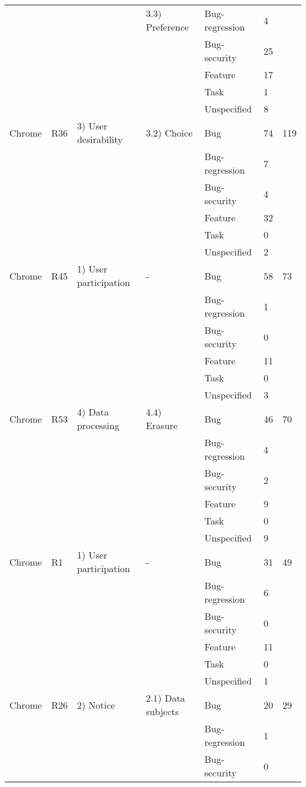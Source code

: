 \documentclass{article}
\begin{document}
\begin{table}[ht]
{\begin{tabular}{|l|l|l|l|l|l|l|}
~ & ~ & ~ & 3.3) Preference & Bug-regression & 4 & ~ \\
~ & ~ & ~ & ~ & Bug-security & 25 & ~ \\
~ & ~ & ~ & ~ & Feature & 17 & ~ \\
~ & ~ & ~ & ~ & Task & 1 & ~ \\
~ & ~ & ~ & ~ & Unspecified & 8 & ~ \\ \hline
Chrome & R36 & 3) User desirability & 3.2) Choice & Bug & 74 & 119 \\
~ & ~ & ~ & ~ & Bug-regression & 7 & ~ \\
~ & ~ & ~ & ~ & Bug-security & 4 & ~ \\
~ & ~ & ~ & ~ & Feature & 32 & ~ \\
~ & ~ & ~ & ~ & Task & 0 & ~ \\
~ & ~ & ~ & ~ & Unspecified & 2 & ~ \\ \hline
Chrome & R45 & 1) User participation & - & Bug & 58 & 73 \\
~ & ~ & ~ & ~ & Bug-regression & 1 & ~ \\
~ & ~ & ~ & ~ & Bug-security & 0 & ~ \\
~ & ~ & ~ & ~ & Feature & 11 & ~ \\
~ & ~ & ~ & ~ & Task & 0 & ~ \\
~ & ~ & ~ & ~ & Unspecified & 3 & ~ \\ \hline
Chrome & R53 & 4) Data processing & 4.4) Erasure & Bug & 46 & 70 \\
~ & ~ & ~ & ~ & Bug-regression & 4 & ~ \\
~ & ~ & ~ & ~ & Bug-security & 2 & ~ \\
~ & ~ & ~ & ~ & Feature & 9 & ~ \\
~ & ~ & ~ & ~ & Task & 0 & ~ \\
~ & ~ & ~ & ~ & Unspecified & 9 & ~ \\ \hline
Chrome & R1 & 1) User participation & - & Bug & 31 & 49 \\
~ & ~ & ~ & ~ & Bug-regression & 6 & ~ \\
~ & ~ & ~ & ~ & Bug-security & 0 & ~ \\
~ & ~ & ~ & ~ & Feature & 11 & ~ \\
~ & ~ & ~ & ~ & Task & 0 & ~ \\
~ & ~ & ~ & ~ & Unspecified & 1 & ~ \\ \hline
Chrome & R26 & 2) Notice & 2.1) Data subjects & Bug & 20 & 29 \\
~ & ~ & ~ & ~ & Bug-regression & 1 & ~ \\
~ & ~ & ~ & ~ & Bug-security & 0 & ~ \\

\end{tabular}}
\end{table}
\end{document}
